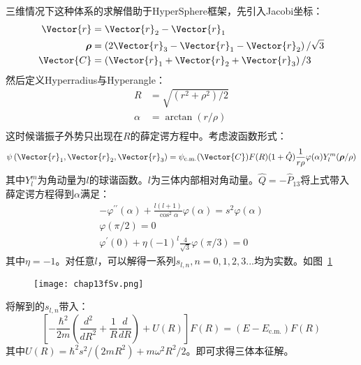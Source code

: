 三维情况下这种体系的求解\cite{Fleix2006prlunitary3b}借助于HyperSphere框架，先引入Jacobi坐标：
\begin{equation}
\begin{split}
\Vector{r}&=\Vector{r}_{2}-\Vector{r}_{1}\\
\boldsymbol{\rho}&=\left(2 \Vector{r}_{3}-\Vector{r}_{1}-\Vector{r}_{2}\right) / \sqrt{3}\\
\Vector{C}&=\left(\Vector{r}_{1}+\Vector{r}_{2}+\Vector{r}_{3}\right) / 3\\
\end{split}
\end{equation}
然后定义Hyperradius与Hyperangle：
\begin{equation}
\begin{split}
R&=\sqrt{\left(r^{2}+\rho^{2}\right) / 2}\\
\alpha&=\arctan (r / \rho)\\
\end{split}
\end{equation}
这时候谐振子外势只出现在$R$的薛定谔方程中。考虑波函数形式：
\begin{equation}
\psi\left(\Vector{r}_{1}, \Vector{r}_{2}, \Vector{r}_{3}\right)=\psi_{\mathrm{c} . \mathrm{m} .}(\Vector{C}) F(R)(1+\hat{Q}) \frac{1}{r \rho} \varphi(\alpha) Y_{l}^{m}(\boldsymbol{\rho} / \rho)
\end{equation}
其中$Y_l^m$为角动量为$l$的球谐函数。$l$为三体内部相对角动量。$\hat{Q}=-\hat{P}_{13}$将上式带入薛定谔方程得到$\alpha$满足：
\begin{equation}
\begin{gathered}
-\varphi^{\prime \prime}(\alpha)+\frac{l(l+1)}{\cos ^{2} \alpha} \varphi(\alpha)=s^{2} \varphi(\alpha) \\
\varphi(\pi / 2)=0 \\
\varphi^{\prime}(0)+\eta(-1)^{l} \frac{4}{\sqrt{3}} \varphi(\pi / 3)=0
\end{gathered}
\end{equation}
其中$\eta=-1$。对任意$l$，可以解得一系列$s_{l,n},n=0,1,2,3...$均为实数。如图~\ref{Sv}~
\begin{figure}[!htbp]
    \centering
    \texttt{[image: chap13fSv.png]}
    \label{Sv}
\end{figure}
将解到的$s_{l,n}$带入：
\begin{equation}
\left[-\frac{\hbar^{2}}{2 m}\left(\frac{d^{2}}{d R^{2}}+\frac{1}{R} \frac{d}{d R}\right)+U(R)\right] F(R)=\left(E-E_{\mathrm{c} . \mathrm{m} .}\right) F(R)
\end{equation}
其中$U(R)=\hbar^{2} s^{2} /\left(2 m R^{2}\right)+m \omega^{2} R^{2} / 2$。即可求得三体本征解。

